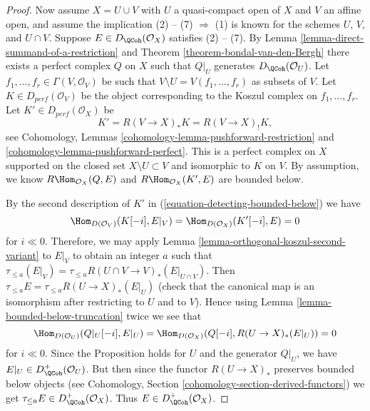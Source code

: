 \begin{proof}
\medskip\noindent
Now assume $X = U \cup V$ with $U$ a quasi-compact open of $X$ and
$V$ an affine open, and assume the implication (2) -- (7) $\Rightarrow$ (1)
is known for the schemes $U$, $V$, and $U \cap V$.
Suppose $E \in D_\QCoh(\mathcal{O}_X)$ satisfies (2) -- (7).
By Lemma \ref{lemma-direct-summand-of-a-restriction} and
Theorem \ref{theorem-bondal-van-den-Bergh} there exists a perfect
complex $Q$ on $X$ such that $Q|_U$ generates $D_\QCoh (\mathcal{O}_U)$. 
Let $f_1, \dots , f_r \in \Gamma (V, \mathcal{O}_V)$
be such that $V \setminus U = V(f_1, \dots , f_r)$ as subsets of
$V$. Let $K \in D_{perf}(\mathcal{O}_V)$ be the object
corresponding to the Koszul complex on $f_1, \dots , f_r$.
Let $K' \in D_{perf}(\mathcal{O}_X)$ be
\begin{equation}
\label{equation-detecting-bounded-below}
K' = R (V \to X)_* K = R (V \to X)_! K,
\end{equation}
see Cohomology, Lemmas \ref{cohomology-lemma-pushforward-restriction} and
\ref{cohomology-lemma-pushforward-perfect}. This is a perfect
complex on $X$ supported on the closed set $X \setminus U \subset V$
and isomorphic to $K$ on $V$. By assumption, we know
$R\Hom_{\mathcal{O}_X}(Q, E)$ and
$R\Hom_{\mathcal{O}_X}(K', E)$ are bounded below.

\medskip\noindent
By the second description of $K'$ in (\ref{equation-detecting-bounded-below})
we have
$$
\Hom_{D(\mathcal{O}_V)}(K[-i], E|_V) = \Hom_{D(\mathcal{O}_X)}(K'[-i], E) = 0
$$
for $i \ll 0$. Therefore, we may apply
Lemma \ref{lemma-orthogonal-koszul-second-variant} to $E|_V$ to
obtain an integer $a$ such that
$\tau_{\leq a}(E|_V) = \tau_{\leq a} R(U \cap V \to V)_*(E|_{U \cap V})$.
Then $\tau_{\leq a} E = \tau_{\leq a} R(U \to X)_*(E|_U)$
(check that the canonical map is an isomorphism after restricting to
$U$ and to $V$). Hence using Lemma \ref{lemma-bounded-below-truncation}
twice we see that
$$
\Hom_{D(\mathcal{O}_U)}(Q|_U [-i], E|_U) =
\Hom_{D(\mathcal{O}_X)}(Q[-i], R (U \to X)_* (E|_U)) = 0
$$
for $i \ll 0$. Since the Proposition holds for $U$ and the generator
$Q|_U$, we have $E|_U \in D^+_\QCoh (\mathcal{O}_U)$. But then since
the functor $R(U \to X)_*$ preserves bounded below objects
(see Cohomology, Section \ref{cohomology-section-derived-functors}) we get
$\tau_{\leq a} E \in D^+_\QCoh(\mathcal{O}_X)$. Thus 
$E \in D^+_\QCoh (\mathcal{O}_X)$.
\end{proof}










